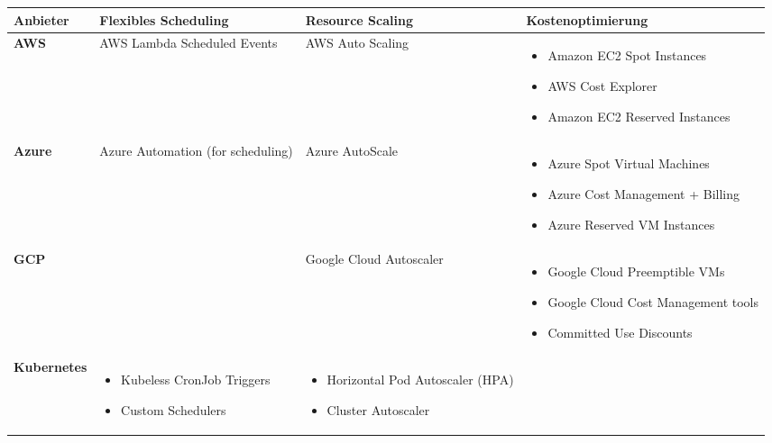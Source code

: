 \begin{tabular}{|l|p{4cm}|p{4cm}|p{4cm}|}
    \hline
    \textbf{Anbieter} & \textbf{Flexibles Scheduling} & \textbf{Resource Scaling} & \textbf{Kostenoptimierung} \\ \hline
    \textbf{AWS} & AWS Lambda Scheduled Events & AWS Auto Scaling & \vspace{-\topsep} \begin{itemize} \item Amazon EC2 Spot Instances \item AWS Cost Explorer \item Amazon EC2 Reserved Instances \end{itemize} \\ \hline
    \textbf{Azure} & Azure Automation (for scheduling) & Azure AutoScale & \vspace{-\topsep} \begin{itemize} \item Azure Spot Virtual Machines \item Azure Cost Management + Billing \item Azure Reserved VM Instances \end{itemize} \\ \hline
    \textbf{GCP} & & Google Cloud Autoscaler & \vspace{-\topsep} \begin{itemize} \item Google Cloud Preemptible VMs \item Google Cloud Cost Management tools \item Committed Use Discounts \end{itemize} \\ \hline
    \textbf{Kubernetes} & \vspace{-\topsep} \begin{itemize} \item Kubeless CronJob Triggers \item Custom Schedulers \end{itemize} & \vspace{-\topsep} \begin{itemize} \item Horizontal Pod Autoscaler (HPA) \item Cluster Autoscaler \end{itemize} & \\ \hline
\end{tabular}

